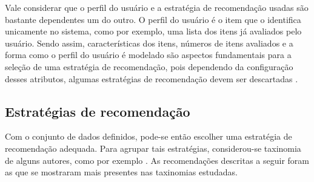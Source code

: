 Vale considerar que o perfil do usuário e a estratégia de recomendação usadas
são bastante dependentes um do outro. O perfil do usuário é o item que o
identifica unicamente no sistema, como por exemplo, uma lista dos itens já
avaliados pelo usuário. Sendo assim, características dos itens, números de itens
avaliados e a forma como o perfil do usuário é modelado são aspectos
fundamentais para a seleção de uma estratégia de recomendação, pois dependendo
da configuração desses atributos, algumas estratégias
de recomendação devem ser descartadas \cite{picault2011get}.

\subsection{Estratégias de recomendação}

Com o conjunto de dados definidos, pode-se então escolher uma estratégia de
recomendação adequada. Para agrupar tais estratégias, considerou-se taxinomia de
alguns autores, como por exemplo \cite{burke2007hybrid}. As recomendações
descritas a seguir foram as que se mostraram mais presentes nas taxinomias
estudadas.

